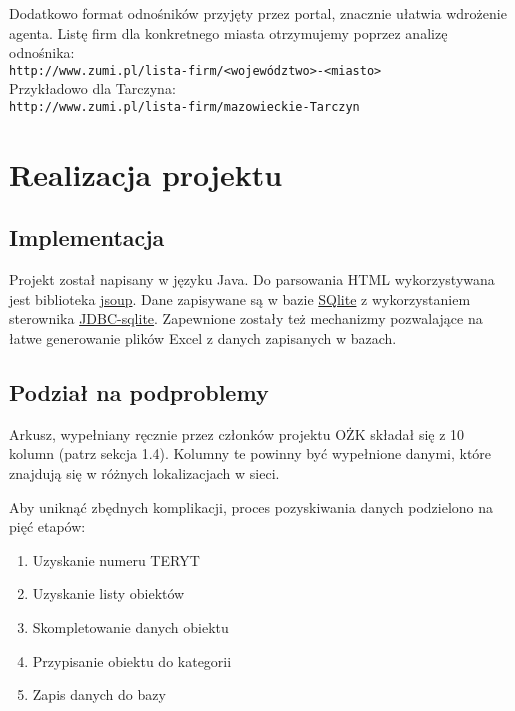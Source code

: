 \documentclass[a4 122pt]{article}
\begin{document}
				\noindent Dodatkowo format odnośników przyjęty przez portal, znacznie ułatwia wdrożenie agenta.
				Listę firm dla konkretnego miasta otrzymujemy poprzez analizę odnośnika:\\
				
				\texttt{http://www.zumi.pl/lista-firm/<województwo>-<miasto>}\\
				
				\noindent Przykładowo dla Tarczyna:\\
				
				\texttt{http://www.zumi.pl/lista-firm/mazowieckie-Tarczyn}
	
	\section{Realizacja projektu}
	
		\subsection{Implementacja}
	
			Projekt został napisany w języku Java.
			Do parsowania HTML wykorzystywana jest biblioteka \href{http://jsoup.org/}{jsoup}.
			Dane zapisywane są w bazie \href{http://www.sqlite.org/}{SQlite} z wykorzystaniem sterownika \href{https://bitbucket.org/xerial/sqlite-jdbc}{JDBC-sqlite}. 
			Zapewnione zostały też mechanizmy pozwalające na łatwe generowanie plików Excel z danych zapisanych w bazach.
	
		\subsection{Podział na podproblemy}
		
			Arkusz, wypełniany ręcznie przez członków projektu OŻK składał się z 10 kolumn (patrz sekcja 1.4).
			Kolumny te powinny być wypełnione danymi, które znajdują się w różnych lokalizacjach w sieci.
			
			Aby uniknąć zbędnych komplikacji, proces pozyskiwania danych podzielono na pięć etapów:
			\begin{enumerate}
				\item Uzyskanie numeru TERYT
				\item Uzyskanie listy obiektów
				\item Skompletowanie danych obiektu
				\item Przypisanie obiektu do kategorii
				\item Zapis danych do bazy
			\end{enumerate}
			
\end{document}
